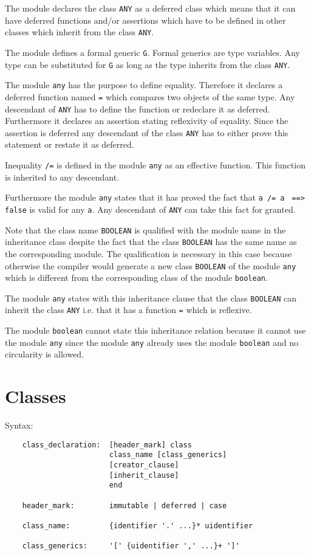 The module declares the class \lstinline!ANY! as a deferred class which means
that it can have deferred functions and/or assertions which have to be defined
in other classes which inherit from the class \lstinline!ANY!.

The module defines a formal generic \lstinline!G!. Formal generics are type
variables. Any type can be substituted for \lstinline!G! as long as the type
inherits from the class \lstinline!ANY!.

The module \lstinline!any! has the purpose to define equality. Therefore it
declares a deferred function named \lstinline!=! which compares two objects of
the same type. Any descendant of \lstinline!ANY! has to define the function or
redeclare it as deferred. Furthermore it declares an assertion stating
reflexivity of equality. Since the assertion is deferred any descendant of the
class \lstinline!ANY!  has to either prove this statement or restate it as
deferred.

Inequality \lstinline!/=! is defined in the module \lstinline!any! as an
effective function. This function is inherited to any descendant.

Furthermore the module \lstinline!any! states that it has proved the fact that
\lstinline!a /= a! \lstinline! ==> false! is valid for any \lstinline!a!. Any
descendant of \lstinline!ANY! can take this fact for granted.

Note that the class name \lstinline!BOOLEAN! is qualified with the module name
in the inheritance class despite the fact that the class \lstinline!BOOLEAN!
has the same name as the corresponding module. The qualification is necessary
in this case because otherwise the compiler would generate a new class
\lstinline!BOOLEAN! of the module \lstinline!any! which is different from the
corresponding class of the module \lstinline!boolean!.

The module \lstinline!any! states with this inheritance clause that the class
\lstinline!BOOLEAN! can inherit the class \lstinline!ANY! i.e. that it has a
function \lstinline!=! which is reflexive.

The module \lstinline!boolean! cannot state this inheritance relation because
it cannot use the module \lstinline!any! since the module \lstinline!any!
already uses the module \lstinline!boolean!  and no circularity is allowed.



\section{Classes}
%
\noindent Syntax:
\begin{lstlisting}
    class_declaration:  [header_mark] class
                        class_name [class_generics]
                        [creator_clause]
                        [inherit_clause]
                        end

    header_mark:        immutable | deferred | case

    class_name:         {identifier '.' ...}* uidentifier

    class_generics:     '[' {uidentifier ',' ...}+ ']'
\end{lstlisting}


